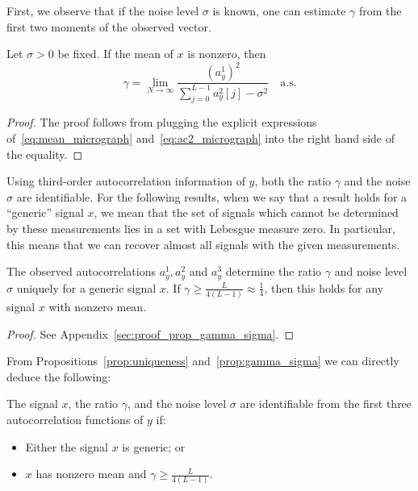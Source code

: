 \documentclass[9pt,twocolumn,twoside,lineno]{pnas-new}
\begin{document}
First, we observe that if the noise level $\sigma$ is known, one can estimate $\gamma$ from the first two moments of the observed vector.
%
\begin{proposition} \label{prop:gamma}
	Let $\sigma > 0$ be fixed. If the mean of $x$ is nonzero, then 
	\begin{equation*}
	\gamma = \lim_{N \to \infty}\frac{(a^1_y)^2}{\sum_{j=0}^{L-1}a_y^2[j]-\sigma^2} \quad \text{a.s.}
	\end{equation*}
\end{proposition}
\begin{proof}
	The proof follows from plugging the explicit expressions of~\eqref{eq:mean_micrograph} and~\eqref{eq:ac2_micrograph} into the right hand side of the equality.
\end{proof}

Using third-order autocorrelation information of $y$, both the ratio $\gamma$ and the noise $\sigma$ are identifiable. For the following results, when we say that a result holds for a ``generic'' signal $x$, we mean that the set of signals which cannot be determined by these measurements
lies in a set with Lebesgue measure zero. 
In particular, this means that we can recover
almost all signals with the given measurements.

\begin{proposition} \label{prop:gamma_sigma}
	The observed autocorrelations $a_y^1,a_y^2$ and  $a_y^3$ determine the ratio $\gamma$ and noise level $\sigma$ uniquely for a generic signal $x$. If $\gamma\geq\frac{L}{4(L-1)}\approx \frac{1}{4}$, then this holds for any signal $x$ with nonzero mean. 
	\begin{proof}
		See Appendix~\ref{sec:proof_prop_gamma_sigma}.
	\end{proof}
\end{proposition}

From Propositions~\ref{prop:uniqueness} and~\ref{prop:gamma_sigma} we can directly deduce the following:
\begin{corollary}
	 The signal $x$, the ratio $\gamma$, and the noise level $\sigma$ are identifiable from the first three autocorrelation functions of $y$ if:
	\begin{itemize}
		\item Either the signal $x$ is generic; or
		\item   $x$ has nonzero mean  and $\gamma\geq\frac{L}{4(L-1)}$.
	\end{itemize}
\end{corollary}
\end{document}
